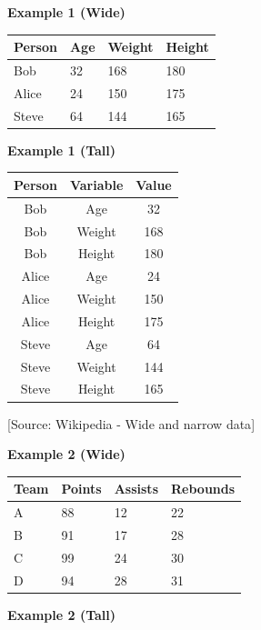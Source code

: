 \documentclass[
  letterpaper,
  DIV=11,
  numbers=noendperiod]{scrreprt}
\begin{document}
\textbf{Example 1 (Wide)}

\begin{longtable}[]{@{}llll@{}}
\toprule\noalign{}
\textbf{Person } & \textbf{Age } & \textbf{Weight } & \textbf{Height
} \\
\midrule\noalign{}
\endhead
\bottomrule\noalign{}
\endlastfoot
Bob & 32 & 168 & 180 \\
Alice & 24 & 150 & 175 \\
Steve & 64 & 144 & 165 \\
\end{longtable}

\textbf{Example 1 (Tall)}

\begin{longtable}[]{@{}ccc@{}}
\toprule\noalign{}
\textbf{Person } & \textbf{Variable } & \textbf{Value } \\
\midrule\noalign{}
\endhead
\bottomrule\noalign{}
\endlastfoot
Bob & Age & 32 \\
Bob & Weight & 168 \\
Bob & Height & 180 \\
Alice & Age & 24 \\
Alice & Weight & 150 \\
Alice & Height & 175 \\
Steve & Age & 64 \\
Steve & Weight & 144 \\
Steve & Height & 165 \\
\end{longtable}

{[}Source: Wikipedia - Wide and narrow data{]}

\textbf{Example 2 (Wide)}

\begin{longtable}[]{@{}llll@{}}
\toprule\noalign{}
Team & Points & Assists & Rebounds \\
\midrule\noalign{}
\endhead
\bottomrule\noalign{}
\endlastfoot
A & 88 & 12 & 22 \\
B & 91 & 17 & 28 \\
C & 99 & 24 & 30 \\
D & 94 & 28 & 31 \\
\end{longtable}

\textbf{Example 2 (Tall)}
\end{document}
